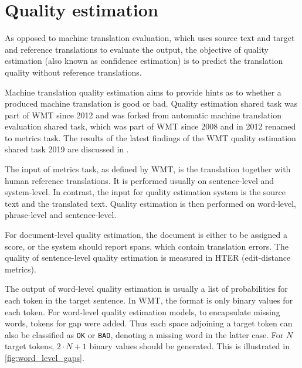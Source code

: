 \section{Quality estimation}
As opposed to machine translation evaluation, which uses source text and target and reference translations to evaluate the output, the objective of quality estimation (also known as confidence estimation) is to predict the translation quality without reference translations.

Machine translation quality estimation aims to provide hints as to whether a produced machine translation is good or bad. Quality estimation shared task was part of WMT since 2012 and was forked from automatic machine translation evaluation shared task, which was part of WMT since 2008 and in 2012 renamed to metrics task. The results of the latest findings of the WMT quality estimation shared task 2019 are discussed in \citep{wmt_qe:2019}.

The input of metrics task, as defined by WMT, is the translation together with human reference translations. It is performed usually on sentence-level and system-level. In contrast, the input for quality estimation system is the source text and the translated text. Quality estimation is then performed on word-level, phrase-level and sentence-level.

For document-level quality estimation, the document is either to be assigned a score, or the system should report spans, which contain translation errors. The quality of sentence-level quality estimation is measured in HTER (edit-distance metrics).


The output of word-level quality estimation is usually a list of probabilities for each token in the target sentence. In WMT, the format is only binary values for each token. For word-level quality estimation models, to encapsulate missing words, tokens for gap were added. Thus each space adjoining a target token can also be classified as \texttt{OK} or \texttt{BAD}, denoting a missing word in the latter case. For $N$ target tokens, $2\cdot N + 1$ binary values should be generated. This is illustrated in \autoref{fig:word_level_gaps}.

